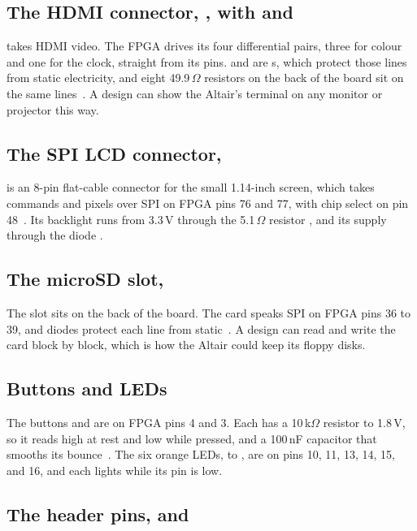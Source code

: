 \documentclass[11pt,a4paper]{article}
\begin{document}
\subsection*{The HDMI connector, , with  and }

 takes HDMI video. The FPGA drives its four differential pairs, three for colour and one for the clock, straight from its pins.  and  are s, which protect those lines from static electricity, and eight 49.9\,$\Omega$ resistors on the back of the board sit on the same lines~\cite[p.~5]{schematic}. A design can show the Altair’s terminal on any monitor or projector this way.

\subsection*{The SPI LCD connector, }

 is an 8-pin flat-cable connector for the small 1.14-inch screen, which takes commands and pixels over SPI on FPGA pins 76 and 77, with chip select on pin 48~\cite[p.~2]{schematic}. Its backlight runs from 3.3\,V through the 5.1\,$\Omega$ resistor , and its supply through the diode .

\subsection*{The microSD slot, }

The slot sits on the back of the board. The card speaks SPI on FPGA pins 36 to 39, and diodes protect each line from static~\cite[p.~2]{schematic}. A design can read and write the card block by block, which is how the Altair could keep its floppy disks.

\subsection*{Buttons and LEDs}

The buttons  and  are on FPGA pins 4 and 3. Each has a 10\,k$\Omega$ resistor to 1.8\,V, so it reads high at rest and low while pressed, and a 100\,nF capacitor that smooths its bounce~\cite[p.~2]{schematic}. The six orange LEDs,  to , are on pins 10, 11, 13, 14, 15, and 16, and each lights while its pin is low.

\subsection*{The header pins,  and }
\end{document}
